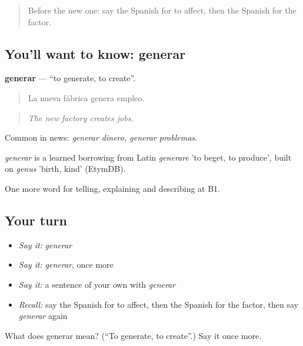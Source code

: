 \label{lesson:ES-C583-generar}



\begin{quote}
Before the new one: say the Spanish for to affect, then the Spanish for the factor.
\end{quote}

\subsection*{You'll want to know: generar}
\textbf{generar} — \textquotedblleft{}to generate, to create\textquotedblright{}.

\begin{quote}
La nueva fábrica genera empleo.
\end{quote}

\begin{quote}
\emph{The new factory creates jobs.}
\end{quote}

Common in news: \emph{generar dinero, generar problemas}.

\begin{cousinweb}
\emph{generar} is a learned borrowing from Latin \emph{generare} 'to beget, to produce', built on \emph{genus} 'birth, kind' (EtymDB).
\end{cousinweb}

\begin{grammarlens}[title={What you've built}]
One more word for telling, explaining and describing at B1.
\end{grammarlens}

\subsection*{Your turn}
\begin{itemize}
\raggedright
  \item \emph{Say it:} \emph{generar}
  \item \emph{Say it:} \emph{generar}, once more
  \item \emph{Say it:} a sentence of your own with \emph{generar}
  \item \emph{Recall:} say the Spanish for to affect, then the Spanish for the factor, then say \emph{generar} again
\end{itemize}

\begin{tcolorbox}[breakable,colback=teal!4,colframe=teal!35!black,title={Before you move on}]
What does generar mean? (\textquotedblleft{}To generate, to create\textquotedblright{}.) Say it once more.
\end{tcolorbox}

